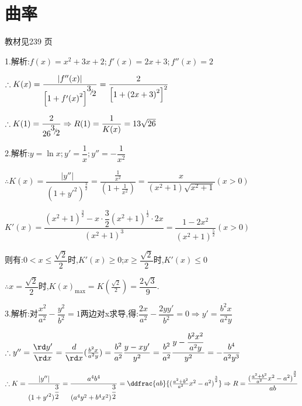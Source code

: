 \section{曲率}
\begin{flushright}
  \color{zhanqing!80}
  \color{zhanqing!80}
   教材见239 页 %
\end{flushright}

1.解析:$f(x) = {x^2} + 3x + 2;f'(x) = 2x + 3;f''(x) = 2$

$\therefore K(x) = \dfrac{{|f''(x)|}}{{{{\left[ {1 + f'{{(x)}^2}} \right]}^{{\raise0.7ex\hbox{$3$} \!\mathord{\left/
 {\vphantom {3 2}}\right.\kern-\nulldelimiterspace}
\!\lower0.7ex\hbox{$2$}}}}}} = \dfrac{2}{{{{\left[ {1 + {{(2x + 3)}^2}} \right]}^2}}}$

$\therefore K(1) = \dfrac{2}{{{{26}^{{\raise0.7ex\hbox{$3$} \!\mathord{\left/
 {\vphantom {3 2}}\right.\kern-\nulldelimiterspace}
\!\lower0.7ex\hbox{$2$}}}}}} \Rightarrow R(1) = \dfrac{1}{{K(x)}} = 13\sqrt {26} $

2.解析:$y = \ln x;y' = \dfrac{1}{x};y'' =  - \dfrac{1}{{{x^2}}}$

$\therefore K(x) = \dfrac{{|y''|}}{{{{(1 + {{y'}^2})}^{\frac{3}{2}}}}} = \dfrac{{\frac{1}{{{x^2}}}}}{{(1 + \frac{1}{{{x^2}}})}} = \dfrac{x}{{({x^2} + 1)\sqrt {{x^2} + 1} }}(x > 0)$

$K'(x) = \dfrac{{{{({x^2} + 1)}^{\frac{3}{2}}} - x \cdot \dfrac{3}{2}{{({x^2} + 1)}^{\frac{1}{2}}} \cdot 2x}}{{{{({x^2} + 1)}^3}}} = \dfrac{{1 - 2{x^2}}}{{{{({x^2} + 1)}^{\frac{5}{2}}}}}(x > 0)$

则有:$0 < x \le \dfrac{{\sqrt 2 }}{2}$时,$K'(x) \ge 0$;$x \ge \dfrac{{\sqrt 2 }}{2}$时,$K'(x) \le 0$

$\therefore x = \dfrac{{\sqrt 2 }}{2}$时,$K{(x)_{\max }} = K(\frac{{\sqrt 2 }}{2}) = \dfrac{{2\sqrt 3 }}{9}$.

3.解析:对$\dfrac{{{x^2}}}{{{a^2}}} - \dfrac{{{y^2}}}{{{b^2}}} = 1$两边对x求导,得:$\dfrac{{2x}}{{{a^2}}} - \dfrac{{2yy'}}{{{b^2}}} = 0 \Rightarrow y' = \dfrac{{{b^2}x}}{{{a^2}y}}$

$\therefore y'' = \dfrac{{\rd y'}}{{\rd x}} = \dfrac{d}{{\rd x}}(\frac{{{b^2}x}}{{{a^2}y}}) = \dfrac{{{b^2}}}{{{a^2}}}\dfrac{{y - xy'}}{{{y^2}}} = \dfrac{{{b^2}}}{{{a^2}}}\dfrac{{y - \dfrac{{{b^2}{x^2}}}{{{a^2}y}}}}{{{y^2}}} =  - \dfrac{{{b^4}}}{{{a^2}{y^3}}}$

$\therefore K = \dfrac{{|y''|}}{{{{(1 + {{y'}^2})}^{\dfrac{3}{2}}}}} = \dfrac{{{a^4}{b^4}}}{{{{({a^4}{y^2} + {b^4}{x^2})}^{\dfrac{3}{2}}}}} = \ddfrac{{ab}}{{{{(\frac{{{a^2} + {b^2}}}{{{a^2}}}{x^2} - {a^2})}^{\frac{3}{2}}}}} \Rightarrow R = \dfrac{{{{(\frac{{{a^2} + {b^2}}}{{{a^2}}}{x^2} - {a^2})}^{\frac{3}{2}}}}}{{ab}}$

